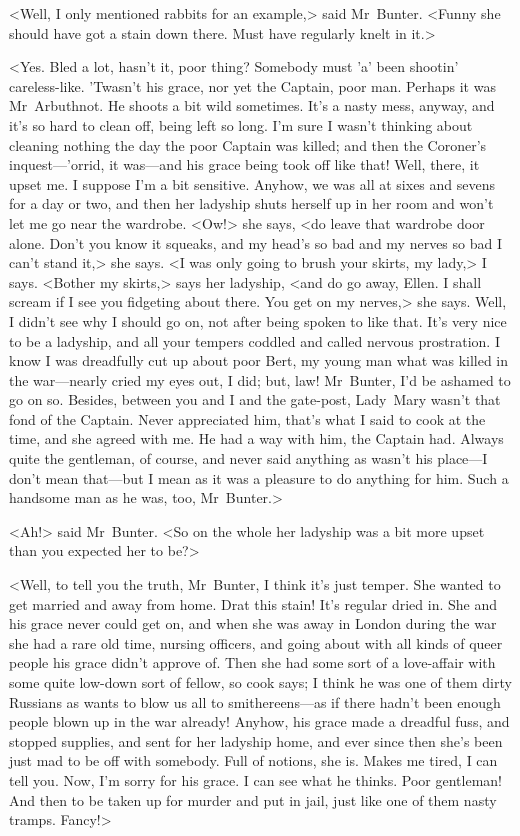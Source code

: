 <Well, I only mentioned rabbits for an example,> said Mr~Bunter.  <Funny she should have got a stain down there. Must have regularly knelt in it.>

<Yes. Bled a lot, hasn't it, poor thing? Somebody must 'a' been shootin' careless-like. 'Twasn't his grace, nor yet the Captain, poor man. Perhaps it was Mr~Arbuthnot. He shoots a bit wild sometimes.  It's a nasty mess, anyway, and it's so hard to clean off, being left so long. I'm sure I wasn't thinking about cleaning nothing the day the poor Captain was killed; and then the Coroner's inquest—'orrid, it was—and his grace being took off like that! Well, there, it upset me.  I suppose I'm a bit sensitive. Anyhow, we was all at sixes and sevens for a day or two, and then her ladyship shuts herself up in her room and won't let me go near the wardrobe. <Ow!> she says, <do leave that wardrobe door alone. Don't you know it squeaks, and my head's so bad and my nerves so bad I can't stand it,> she says. <I was only going to brush your skirts, my lady,> I says. <Bother my skirts,> says her ladyship, <and do go away, Ellen. I shall scream if I see you fidgeting about there. You get on my nerves,> she says. Well, I didn't see why I should go on, not after being spoken to like that. It's very nice to be a ladyship, and all your tempers coddled and called nervous prostration. I know I was dreadfully cut up about poor Bert, my young man what was killed in the war—nearly cried my eyes out, I did; but, law! Mr~Bunter, I'd be ashamed to go on so. Besides, between you and I and the gate-post, Lady~Mary wasn't that fond of the Captain. Never appreciated him, that's what I said to cook at the time, and she agreed with me. He had a way with him, the Captain had. Always quite the gentleman, of course, and never said anything as wasn't his place—I don't mean that—but I mean as it was a pleasure to do anything for him. Such a handsome man as he was, too, Mr~Bunter.>

<Ah!> said Mr~Bunter. <So on the whole her ladyship was a bit more upset than you expected her to be?>

<Well, to tell you the truth, Mr~Bunter, I think it's just temper. She wanted to get married and away from home. Drat this stain! It's regular dried in. She and his grace never could get on, and when she was away in London during the war she had a rare old time, nursing officers, and going about with all kinds of queer people his grace didn't approve of.  Then she had some sort of a love-affair with some quite low-down sort of fellow, so cook says; I think he was one of them dirty Russians as wants to blow us all to smithereens—as if there hadn't been enough people blown up in the war already! Anyhow, his grace made a dreadful fuss, and stopped supplies, and sent for her ladyship home, and ever since then she's been just mad to be off with somebody. Full of notions, she is. Makes me tired, I can tell you. Now, I'm sorry for his grace. I can see what he thinks. Poor gentleman! And then to be taken up for murder and put in jail, just like one of them nasty tramps.  Fancy!>

